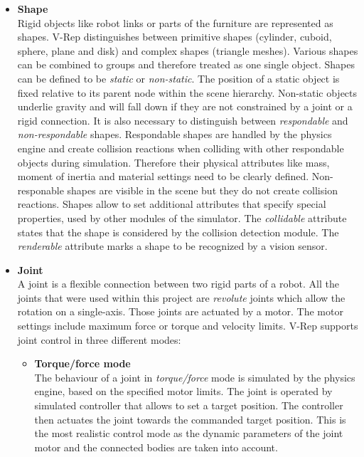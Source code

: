 \begin{itemize}
\item \textbf{Shape} \\
Rigid objects like robot links or parts of the furniture are represented as shapes. V-Rep distinguishes between primitive shapes (cylinder, cuboid, sphere, plane and disk) and complex shapes (triangle meshes). Various shapes can be combined to groups and therefore treated as one single object. Shapes can be defined to be \emph{static} or \emph{non-static}. The position of a static object is fixed relative to its parent node within the scene hierarchy. Non-static objects underlie gravity and will fall down if they are not constrained by a joint or a rigid connection. It is also necessary to distinguish between \emph{respondable} and \emph{non-respondable} shapes. Respondable shapes are handled by the physics engine and create collision reactions when colliding with other respondable objects during simulation. Therefore their physical attributes like mass, moment of inertia and material settings need to be clearly defined. Non-responable shapes are visible in the scene but they do not create collision reactions. Shapes allow to set additional attributes that specify special properties, used by other modules of the simulator. The \emph{collidable} attribute states that the shape is considered by the collision detection module. The \emph{renderable} attribute marks a shape to be recognized by a vision sensor.

\item \textbf{Joint} \\
A joint is a flexible connection between two rigid parts of a robot. All the joints that were used within this project are \emph{revolute} joints which allow the rotation on a single-axis. Those joints are actuated by a motor. The motor settings include maximum force or torque and velocity limits. V-Rep supports joint control in three different modes:
\begin{itemize}

\item \textbf{Torque/force mode} \\
The behaviour of a joint in \emph{torque/force} mode is simulated by the physics engine, based on the specified motor limits. The joint is operated by simulated controller that allows to set a target position. The controller then actuates the joint towards the commanded target position. This is the most realistic control mode as the dynamic parameters of the joint motor and the connected bodies are taken into account.


\end{itemize}
\end{itemize}
